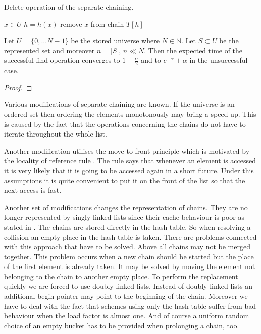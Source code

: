 \begin{algorithm}
\caption{Delete operation of the separate chaining.}
\label{algorithm-delete-separate-chaining}
\begin{algorithmic}
\REQUIRE $x \in U$
\STATE $h = h(x)$
\STATE
{}
	\STATE remove $x$ from chain $T[h]$
\ENDIF
\end{algorithmic}
\end{algorithm}

\begin{theorem}
Let $U = \{0, \dots N - 1\}$ be the stored universe where $N \in \mathbb{N}$. Let $S \subset U$ be the represented set and moreover $n = |S|$, $n \ll N$. Then the expected time of the successful find operation converges to $1 + \frac{\alpha}{2}$ and to $e^{-\alpha} + \alpha$ in the unsuccessful case.
\end{theorem}
\begin{proof}

\end{proof}

Various modifications of separate chaining are known. If the universe is an ordered set then ordering the elements monotonously may bring a speed up. This is caused by the fact that the operations concerning the chains do not have to iterate throughout the whole list. 

Another modification utilises the move to front principle \cite{723912} which is motivated by the locality of reference rule \cite{DBLP:books/aw/AhoSU86}. The rule says that whenever an element is accessed it is very likely that it is going to be accessed again in a short future. Under this assumptions it is quite convenient to put it on the front of the list so that the next access is fast.

Another set of modifications changes the representation of chains. They are no longer represented by singly linked lists since their cache behaviour \cite{1200662} is poor as stated in \cite{Rubin99virtualcache}. The chains are stored directly in the hash table. So when resolving a collision an empty place in the hash table is taken. There are problems connected with this approach that have to be solved. Above all chains may not be merged together. This problem occurs when a new chain should be started but the place of the first element is already taken. It may be solved by moving the element not belonging to the chain to another empty place. To perform the replacement quickly we are forced to use doubly linked lists. Instead of doubly linked lists an additional begin pointer may point to the beginning of the chain. Moreover we have to deal with the fact that schemes using only the hash table suffer from bad behaviour when the load factor is almost one. And of course a uniform random choice of an empty bucket has to be provided when prolonging a chain, too.

